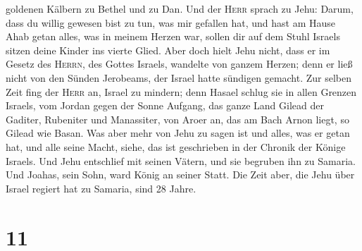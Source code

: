 goldenen Kälbern zu Bethel und zu Dan.  Und der
\textsc{Herr} sprach zu Jehu: Darum, dass du willig gewesen bist zu tun,
was mir gefallen hat, und hast am Hause Ahab getan alles, was in meinem
Herzen war, sollen dir auf dem Stuhl Israels sitzen deine Kinder ins
vierte Glied.  Aber doch hielt Jehu nicht, dass er im
Gesetz des \textsc{Herrn}, des Gottes Israels, wandelte von ganzem
Herzen; denn er ließ nicht von den Sünden Jerobeams, der Israel hatte
sündigen gemacht.  Zur selben Zeit fing der \textsc{Herr}
an, Israel zu mindern; denn Hasael schlug sie in allen Grenzen Israels,
 vom Jordan gegen der Sonne Aufgang, das ganze Land
Gilead der Gaditer, Rubeniter und Manassiter, von Aroer an, das am Bach
Arnon liegt, so Gilead wie Basan.  Was aber mehr von Jehu
zu sagen ist und alles, was er getan hat, und alle seine Macht, siehe,
das ist geschrieben in der Chronik der Könige Israels. 
Und Jehu entschlief mit seinen Vätern, und sie begruben ihn zu Samaria.
Und Joahas, sein Sohn, ward König an seiner Statt.  Die
Zeit aber, die Jehu über Israel regiert hat zu Samaria, sind 28 Jahre.

\hypertarget{section-10}{%
\section{11}\label{section-10}}

